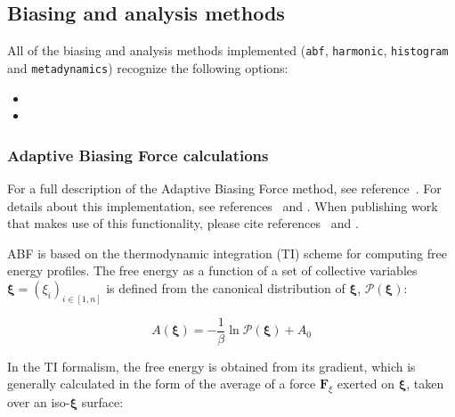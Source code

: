 \subsection{Biasing and analysis methods}
\label{sec:colvarbias}

All of the biasing and analysis methods implemented (\texttt{abf},
\texttt{harmonic}, \texttt{histogram} and \texttt{metadynamics})
recognize the following options:
\begin{itemize}

\item %

\item %

\end{itemize}


\subsubsection{Adaptive Biasing Force calculations}
\label{sec:colvarbias_abf}

For a full description of the Adaptive Biasing Force method, see
reference~\cite{Darve2008}. For details about this implementation,
see references~\cite{Henin2004} and \cite{Henin2009}. When
publishing work that makes use of this functionality, please cite
references~\cite{Darve2008} and \cite{Henin2009}.

ABF is based on the thermodynamic integration (TI) scheme for
computing free energy profiles. The free energy as a function
of a set of collective variables $\bm{\xi}=(\xi_{i})_{i\in[1,n]}$
is defined from the canonical distribution of $\bm{\xi}$, ${\mathcal P}(\bm{\xi})$:

\begin{equation}
  \label{eq:free}
  A(\bm{\xi}) = -\frac{1}{\beta} \ln {\mathcal P}(\bm{\xi}) + A_0
\end{equation}

In the TI formalism, the free energy is obtained from its gradient, 
which is generally calculated in the form of the average of a force
$\bm{F}_\xi$ exerted on $\bm{\xi}$, taken over an iso-$\bm{\xi}$ surface:

